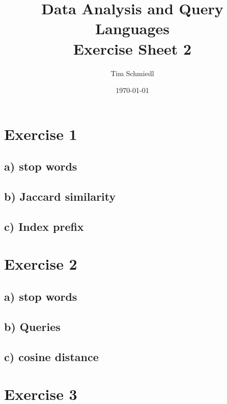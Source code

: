 \documentclass{article}
\begin{document}
\title{Data Analysis and Query Languages \\
 Exercise Sheet 2}
\date{\today}
\author{Tim Schmiedl}
\maketitle

\section*{Exercise 1}
\subsection*{a) stop words}

\subsection*{b) Jaccard similarity}

\subsection*{c) Index prefix}

\vspace{2cm}
\section*{Exercise 2}
\subsection*{a) stop words}

\subsection*{b) Queries}

\subsection*{c) cosine distance}


\vspace{2cm}
\section*{Exercise 3}
\end{document}
